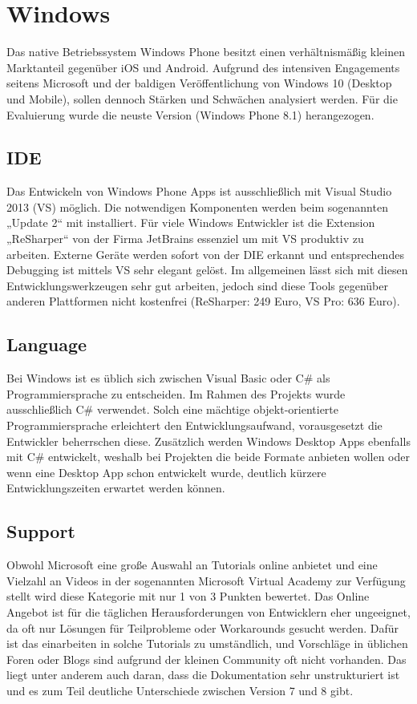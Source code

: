 \section{Windows}

Das native Betriebssystem Windows Phone besitzt einen verhältnismäßig kleinen Marktanteil gegenüber iOS und Android. Aufgrund des intensiven Engagements seitens Microsoft und der baldigen Veröffentlichung von Windows 10 (Desktop und Mobile), sollen dennoch Stärken und Schwächen analysiert werden. Für die Evaluierung wurde die neuste Version (Windows Phone 8.1) herangezogen.

\subsection{IDE}

Das Entwickeln von Windows Phone Apps ist ausschließlich mit Visual Studio 2013 (VS) möglich. Die notwendigen Komponenten werden beim sogenannten „Update 2“ mit installiert. Für viele Windows Entwickler ist die Extension „ReSharper“ von der Firma JetBrains essenziel um mit VS produktiv zu arbeiten. Externe Geräte werden sofort von der DIE erkannt und entsprechendes Debugging ist mittels VS sehr elegant gelöst. Im allgemeinen lässt sich mit diesen Entwicklungswerkzeugen sehr gut arbeiten, jedoch sind diese Tools gegenüber anderen Plattformen nicht kostenfrei (ReSharper: 249 Euro, VS Pro: 636 Euro).

\subsection{Language}

Bei Windows ist es üblich sich zwischen Visual Basic oder C# als Programmiersprache zu entscheiden. Im Rahmen des Projekts wurde ausschließlich C# verwendet. Solch eine mächtige objekt-orientierte Programmiersprache erleichtert den Entwicklungsaufwand, vorausgesetzt die Entwickler beherrschen diese. Zusätzlich werden Windows Desktop Apps ebenfalls mit C# entwickelt, weshalb bei Projekten die beide Formate anbieten wollen oder wenn eine Desktop App schon entwickelt wurde, deutlich kürzere Entwicklungszeiten erwartet werden können.

\subsection{Support}

Obwohl Microsoft eine große Auswahl an Tutorials online anbietet und eine Vielzahl an Videos in der sogenannten Microsoft Virtual Academy zur Verfügung stellt wird diese Kategorie mit nur 1 von 3 Punkten bewertet.  Das Online Angebot ist für die täglichen Herausforderungen von Entwicklern eher ungeeignet, da oft nur Lösungen für Teilprobleme oder Workarounds gesucht werden. Dafür ist das einarbeiten in solche Tutorials zu umständlich, und Vorschläge in üblichen Foren oder Blogs sind aufgrund der kleinen Community oft nicht vorhanden. Das liegt unter anderem auch daran, dass die Dokumentation sehr unstrukturiert ist und es zum Teil deutliche Unterschiede zwischen Version 7 und 8 gibt.

